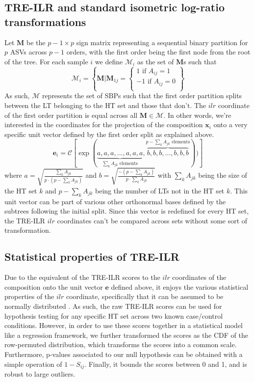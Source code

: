 \documentclass{article}
\begin{document}
\subsection{TRE-ILR and standard isometric log-ratio transformations}
\noindent Let $\bm M$ be the $p-1 \times p$ sign matrix representing a sequential binary partition for $p$ ASVs across $p-1$ orders, with the first order being the first node from the root of the tree. For each sample $i$ we define $\mathcal{M}_i$ as the set of $\bm M$s such that 
\[ \mathcal{M}_i = \left\{\bm{M} | \bm{M}_{1j} = \begin{cases}
    1 \text{ if } A_{ij} = 1\\
    -1 \text{ if } A_{ij} = 0\\ 
\end{cases}
\right \}
\]
As such, $\mathcal{M}$ represents the set of SBPs such that the first order partition splits between the LT belonging to the HT set and those that don't. The $ilr$ coordinate of the first order partition is equal across all $\bm{M} \in \mathcal{M}$. In other words, we're interested in the coordinates for the projection of the composition $\bm{x}_{i}$ onto a very specific unit vector defined by the first order split as explained above.  
\[\bm{e}_i = \mathcal{C}[\exp(\underbrace{a, a, a,..., a, a, a}_{\sum_k A_{jk} \text{ elements}},\overbrace{b,b,b,...,b,b,b}^{p - \sum_k A_{jk} \text{ elements}}))] \]  
where $a = \sqrt{\frac{\sum_k A_{jk}}{p \cdot (p - \sum_k A_{jk})}}$ and $b = \sqrt{\frac{-(p - \sum_k A_{jk})}{p \cdot \sum_k A_{jk}}}$ with $\sum_k A_{jk}$ being the size of the HT set $k$ and $p - \sum_k A_{jk}$ being the number of LTs not in the HT set $k$. This unit vector can be part of various other orthonormal bases defined by the subtrees following the initial split. Since this vector is redefined for every HT set, the TRE-ILR $ilr$ coordinates can't be compared across sets without some sort of transformation.  
 
\subsection{Statistical properties of TRE-ILR}
Due to the equivalent of the TRE-ILR scores to the $ilr$ coordinates of the composition onto the unit vector $\bm{e}$ defined above, it enjoys the various statistical properties of the $ilr$ coordinate, specifically that it can be assumed to be normally distributed \cite{egozcue2003,egozcue2005}. As such, the raw TRE-ILR scores can be used for hypothesis testing for any specific HT set across two known case/control conditions. However, in order to use these scores together in a statistical model like a regression framework, we further transformed the scores as the CDF of the row-permuted distribution, which transforms the scores into a common scale. Furthermore, p-values associated to our null hypothesis can be obtained with a simple operation of $1 - S_{ij}$. Finally, it bounds the scores between 0 and 1, and is robust to large outliers.  



\newpage
{}

\end{document}
